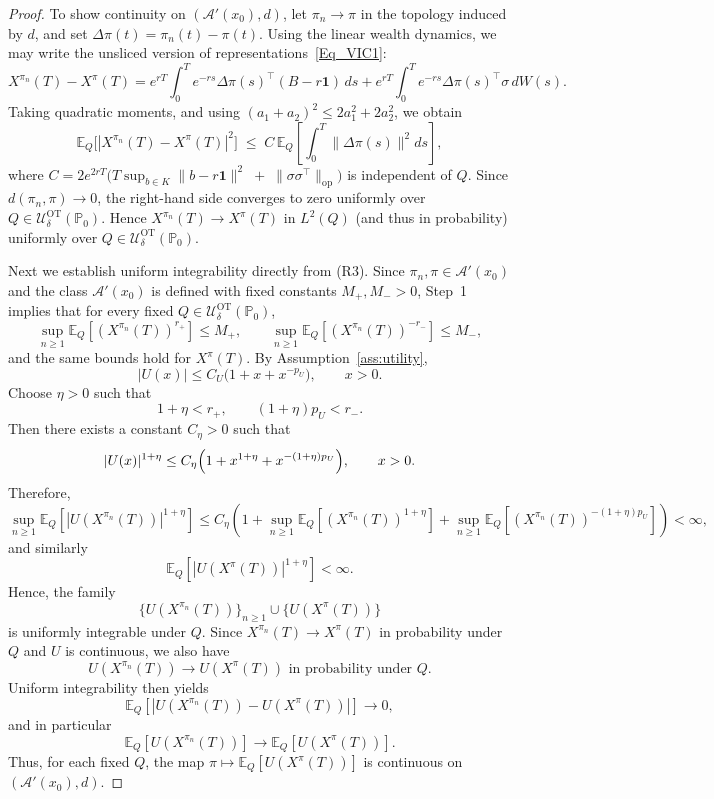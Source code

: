\documentclass[11pt]{article}
\theoremstyle{definition}
\begin{document}
\begin{proof}
To show continuity on $(\mathcal{A}'(x_0),d)$, let $\pi_n \to \pi$ in the topology
induced by $d$, and set $\Delta\pi(t) = \pi_n(t)-\pi(t)$. 
{Using the linear wealth dynamics, we may write the unsliced version of
representations~\eqref{Eq_VIC1}: 
\[
X^{\pi_n}(T)-X^\pi(T)
=
e^{rT}\int_0^T e^{-rs}\Delta\pi(s)^\top(B-r\mathbf{1})\,ds
+
e^{rT}\int_0^T e^{-rs}\Delta\pi(s)^\top\sigma\,dW(s).
\]} Taking quadratic moments,
and using $(a_1+a_2)^2 \le 2a_1^2 + 2a_2^2$, we obtain
\[
\mathbb{E}_{Q}\!\big[|X^{\pi_n}(T) - X^\pi(T)|^2\big]
\;\le\; C \,\mathbb{E}_{Q}\!\left[\int_0^T \|\Delta\pi(s)\|^2 ds\right],
\]
where $C = 2 e^{2rT}\Big( T \sup_{b\in K} \|b - r\mathbf{1}\|^2
\;+\; \|\sigma \sigma^\top\|_{\mathrm{op}}\Big)$
is independent of ${Q}$. Since $d(\pi_n,\pi) \to 0$, the right-hand side
converges to zero uniformly over ${Q}\in\mathcal{U}^{\text{OT}}_{\delta}(\mathbb{P}_0)$.
Hence $X^{\pi_n}(T) \to X^\pi(T) \text{ in } L^2({Q})$ (and thus in probability)
uniformly over ${Q}\in\mathcal{U}^{\text{OT}}_{\delta}(\mathbb{P}_0)$.

Next we establish uniform integrability
{ directly from (R3).
Since $\pi_n,\pi \in \mathcal{A}'(x_0)$ and the class $\mathcal{A}'(x_0)$ is defined with fixed constants
$M_+,M_->0$, Step~1 implies that for every fixed
${Q}\in\mathcal{U}^{\mathrm{OT}}_{\delta}(\mathbb{P}_0)$,
\[
\sup_{n\ge 1}\mathbb{E}_{{Q}}\!\left[(X^{\pi_n}(T))^{r_+}\right]\le M_+,
\qquad
\sup_{n\ge 1}\mathbb{E}_{{Q}}\!\left[(X^{\pi_n}(T))^{-r_-}\right]\le M_-,
\]
and the same bounds hold for $X^\pi(T)$.
By Assumption~\ref{ass:utility},
\[
|U(x)| \le C_U\bigl(1+x+x^{-p_U}\bigr),\qquad x>0.
\]
Choose $\eta>0$ such that
\[
1+\eta<r_+,
\qquad
(1+\eta)p_U<r_-.
\]
Then there exists a constant $C_\eta>0$ such that
\[
|U(x)|^{1+\eta}
\le
C_\eta\Bigl(1+x^{1+\eta}+x^{-(1+\eta)p_U}\Bigr),
\qquad x>0.
\]
Therefore,
\[
\sup_{n\ge 1}\mathbb{E}_{{Q}}\!\left[|U(X^{\pi_n}(T))|^{1+\eta}\right]
\le
C_\eta\left(
1+
\sup_{n\ge 1}\mathbb{E}_{{Q}}\!\left[(X^{\pi_n}(T))^{1+\eta}\right]
+
\sup_{n\ge 1}\mathbb{E}_{{Q}}\!\left[(X^{\pi_n}(T))^{-(1+\eta)p_U}\right]
\right)
<\infty,
\]
and similarly
\[
\mathbb{E}_{{Q}}\!\left[|U(X^\pi(T))|^{1+\eta}\right]<\infty.
\]
Hence, the family
\[
\{U(X^{\pi_n}(T))\}_{n\ge 1}\cup\{U(X^\pi(T))\}
\]
is uniformly integrable under ${Q}$.
Since $X^{\pi_n}(T)\to X^\pi(T)$ in probability under ${Q}$ and $U$ is continuous, we also have
\[
U(X^{\pi_n}(T))\to U(X^\pi(T))
\text{ in probability under }{Q}.
\]
Uniform integrability then yields
\[
\mathbb{E}_{{Q}}\!\left[\left|U(X^{\pi_n}(T))-U(X^\pi(T))\right|\right]\to 0,
\]
and in particular
\[
\mathbb{E}_{{Q}}\!\left[U(X^{\pi_n}(T))\right]
\longrightarrow
\mathbb{E}_{{Q}}\!\left[U(X^\pi(T))\right].
\]}
Thus, for each fixed ${Q}$, the map
$\pi\mapsto \mathbb{E}_{Q}[U(X^\pi(T))]$ is continuous on
$(\mathcal{A}'(x_0),d)$.



\end{proof}
\end{document}
